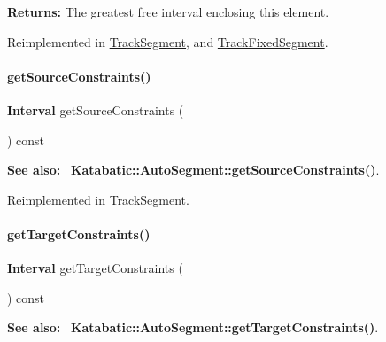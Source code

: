 {\bfseries Returns\+:} The greatest free interval enclosing this element. 

Reimplemented in \mbox{\hyperlink{classKite_1_1TrackSegment_a034711e2d3617ea848ef9f5a18255e10}{Track\+Segment}}, and \mbox{\hyperlink{classKite_1_1TrackFixedSegment_a034711e2d3617ea848ef9f5a18255e10}{Track\+Fixed\+Segment}}.

\mbox{\label{classKite_1_1TrackElement_a48f8b54f9489da3778d85c382a483f81}} 
\paragraph{\texorpdfstring{get\+Source\+Constraints()}{getSourceConstraints()}}
{\footnotesize\ttfamily \textbf{ Interval} get\+Source\+Constraints (\begin{DoxyParamCaption}{ }\end{DoxyParamCaption}) const\hspace{0.3cm}{\ttfamily [virtual]}}

{\bfseries See also\+:}~ \textbf{ Katabatic\+::\+Auto\+Segment\+::get\+Source\+Constraints()}. 

Reimplemented in \mbox{\hyperlink{classKite_1_1TrackSegment_a48f8b54f9489da3778d85c382a483f81}{Track\+Segment}}.

\mbox{\label{classKite_1_1TrackElement_a69af7d4287bc0e44c9ca2c8e6f692be9}} 
\paragraph{\texorpdfstring{get\+Target\+Constraints()}{getTargetConstraints()}}
{\footnotesize\ttfamily \textbf{ Interval} get\+Target\+Constraints (\begin{DoxyParamCaption}{ }\end{DoxyParamCaption}) const\hspace{0.3cm}{\ttfamily [virtual]}}

{\bfseries See also\+:}~ \textbf{ Katabatic\+::\+Auto\+Segment\+::get\+Target\+Constraints()}. 

